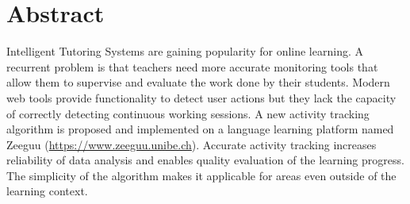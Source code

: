 \begingroup
\let\clearpage\relax
\let\cleardoublepage\relax
\let\cleardoublepage\relax

\chapter*{Abstract}
Intelligent Tutoring Systems are gaining popularity for online learning. A recurrent problem is that teachers need more accurate monitoring tools that allow them to supervise and evaluate the work done by their students. 
Modern web tools provide functionality to detect user actions but they lack the capacity of correctly detecting continuous working sessions. A new activity tracking algorithm is proposed and implemented on a language learning platform named Zeeguu (\url{https://www.zeeguu.unibe.ch}). Accurate activity tracking increases reliability of data analysis and enables quality evaluation of the learning progress. The simplicity of the algorithm makes it applicable for areas even outside of the learning context.




\vfill
%

\endgroup

\vfill
